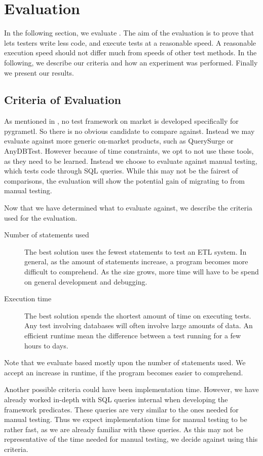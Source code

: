 \section{Evaluation}\label{sect:eval}
In the following section, we evaluate \FW{}. The aim of the evaluation is to prove that \FW{} lets testers write less code, and execute tests at a reasonable speed. A reasonable execution speed should not differ much from speeds of other test methods.   In the following, we describe our criteria and how an experiment was performed. Finally we present our results.

\subsection{Criteria of Evaluation}\label{subsect:CoE}
As mentioned in , no test framework on market is developed specifically for pygrametl. So there is no obvious candidate to compare against. Instead we may evaluate against more generic on-market products, such as QuerySurge or AnyDBTest. However because of time constraints, we opt to not use these tools, as they need to be learned. Instead we choose to evaluate against manual testing, which tests code through SQL queries. While this may not be the fairest of comparisons, the evaluation will show the potential gain of migrating to \FW{} from manual testing.

Now that we have determined what to evaluate \FW{} against, we describe the criteria used for the evaluation.  

\begin{description}
\item[Number of statements used] The best solution uses the fewest statements to test an ETL system. In general, as the amount of statements increase, a program becomes more difficult to comprehend. As the size grows, more time will have to be spend on general development and debugging.
\item[Execution time] The best solution spends the shortest amount of time on executing tests. Any test involving databases will often involve large amounts of data. An efficient runtime mean the difference between a test running for a few hours to days.
\end{description}

Note that we evaluate based mostly upon the number of statements used. We accept an increase in runtime, if the program becomes easier to comprehend.

Another possible criteria could have been implementation time. However, we have already worked in-depth with SQL queries internal when developing the framework predicates. These queries are very similar to the ones needed for manual testing. Thus we expect implementation time for manual testing to be rather fast, as we are already familiar with these queries.  As this may not be representative of the time needed for manual testing, we decide against using this criteria.  


